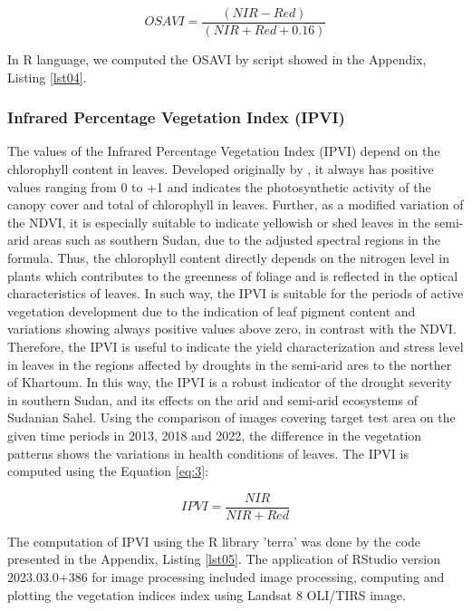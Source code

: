 \documentclass[jimaging,article,submit,pdftex,moreauthors]{Definitions/mdpi}
\begin{document}
\begin{equation}\label{eq:4}
	OSAVI=\dfrac{(NIR-Red)}{(NIR+Red+0.16)}
\end{equation}

In R language, we computed the OSAVI by script showed in the Appendix, Listing \ref{lst04}.

\subsubsection{Infrared Percentage Vegetation Index (IPVI)}

The values of the Infrared Percentage Vegetation Index (IPVI) depend on the chlorophyll content in leaves. Developed originally by \cite{CRIPPEN199071}, it always has positive values ranging from 0 to +1 and indicates the photosynthetic activity of the canopy cover and total of chlorophyll in leaves. Further, as a modified variation of the NDVI, it is especially suitable to indicate yellowish or shed leaves in the semi-arid areas such as southern Sudan, due to the adjusted spectral regions in the formula. Thus, the chlorophyll content directly depends on the nitrogen level in plants which contributes to the greenness of foliage and is reflected in the optical characteristics of leaves. In such way, the IPVI is suitable for the periods of active vegetation development due to the indication of leaf pigment content and variations showing always positive values above zero, in contrast with the NDVI. Therefore, the IPVI is useful to indicate the yield characterization and stress level in leaves in the regions affected by droughts in the semi-arid ares to the norther of Khartoum. In this way, the IPVI is a robust indicator of the drought severity in southern Sudan, and its effects on the arid and semi-arid ecosystems of Sudanian Sahel. Using the comparison of images covering target test area on the given time periods in 2013, 2018 and 2022, the difference in the vegetation patterns shows the variations in health conditions of leaves. The IPVI is computed using the Equation \ref{eq:3}:

\begin{equation}\label{eq:3}
	IPVI=\dfrac{NIR}{NIR + Red}
\end{equation}

The computation of IPVI using the R library 'terra' was done by the code presented in the Appendix, Listing \ref{lst05}. The application of RStudio version 2023.03.0+386 \cite{RStudio} for image processing included image processing, computing and plotting the vegetation indices index using Landsat 8 OLI/TIRS image. 
\end{document}
